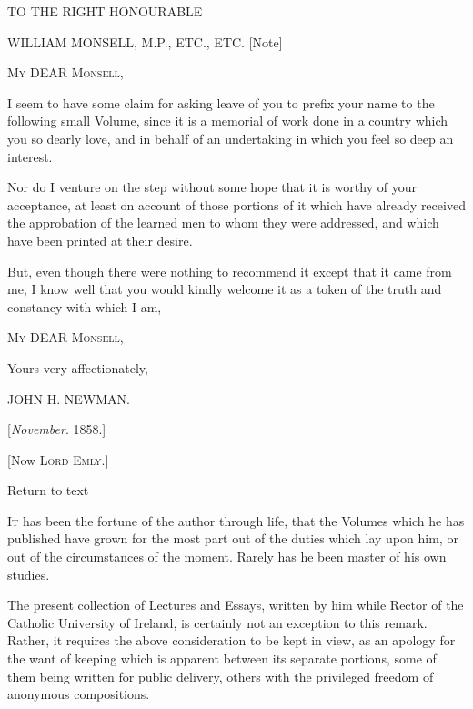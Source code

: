 





TO THE RIGHT HONOURABLE


WILLIAM MONSELL, M.P., ETC.,
ETC. [Note]


M\textsc{y} DEAR M\textsc{onsell},

I seem to have some claim for asking leave of you to prefix your name
to the following small Volume, since it is a memorial of work done in a
country which you so dearly love, and in behalf of an undertaking in
which you feel so deep an interest.


Nor do I venture on the step without some hope that it is worthy of
your acceptance, at least on account of those portions of it which have
already received the approbation of the learned men to whom they were
addressed, and which have been printed at their desire.


But, even though there were nothing to recommend it except that it
came from me, I know well that you would kindly welcome it as a token of
the truth and constancy with which I am,

M\textsc{y} DEAR M\textsc{onsell},

Yours very affectionately,

JOHN H. NEWMAN.


[\emph{November}. 1858.]






[Now L\textsc{ord} E\textsc{mly}.]

Return to text








I\textsc{t} has been the fortune of the author through life, that the Volumes
which he has published have grown for the most part out of the duties
which lay upon him, or out of the circumstances of the moment. Rarely
has he been master of his own studies.


The present collection of Lectures and Essays, written by him while
Rector of the Catholic University of Ireland, is certainly not an
exception to this remark. Rather, it requires the above consideration to
be kept in view, as an apology for the want of keeping which is apparent
between its separate portions, some of them being written for public
delivery, others with the privileged freedom of anonymous compositions.


